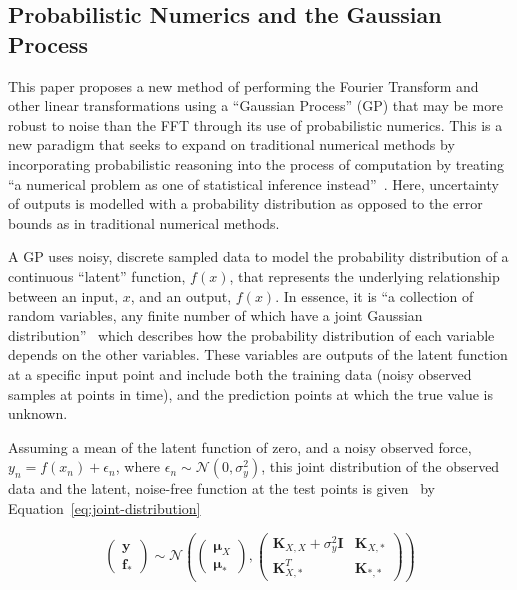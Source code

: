 \documentclass[12pt]{article}
\begin{document}
    \subsection{Probabilistic Numerics and the Gaussian Process}
    This paper proposes a new method of performing the Fourier Transform and other linear transformations using a ``Gaussian Process'' (GP) that may be more robust to noise than the FFT through its use of probabilistic numerics.
    This is a new paradigm that seeks to expand on traditional numerical methods by incorporating probabilistic reasoning into the process of computation by treating ``a numerical problem as one of statistical inference instead''~\cite{ProbabilisticNumerics2023}.
    Here, uncertainty of outputs is modelled with a probability distribution as opposed to the error bounds as in traditional numerical methods.

    A GP uses noisy, discrete sampled data to model the probability distribution of a continuous ``latent'' function, $f(x)$, that represents the underlying relationship between an input, $x$, and an output, $f(x)$.
    In essence, it is ``a collection of random variables, any finite number of which have a joint Gaussian distribution''~\cite{rasmussen2006gaussian} which describes how the probability distribution of each variable depends on the other variables.
    These variables are outputs of the latent function at a specific input point and include both the training data (noisy observed samples at points in time), and the prediction points at which the true value is unknown.

    Assuming a mean of the latent function of zero, and a noisy observed force, $y_n = f(x_n)+\epsilon_n$, where $\epsilon_n \sim \mathcal{N}(0, \sigma^2_y)$, this joint distribution of the observed data and the latent, noise-free function at the test points is given~\cite{murphy2023probabilistic} by Equation~\ref{eq:joint-distribution}

    \begin{equation}
        \begin{pmatrix}
            \mathbf{y} \\
            \mathbf{f}_*
        \end{pmatrix}
        \sim \mathcal{N} \left(
        \begin{pmatrix}
            \boldsymbol{\mu}_X \\
            \boldsymbol{\mu}_*
        \end{pmatrix},
        \begin{pmatrix}
            \mathbf{K}_{X,X} + \sigma^2_y \mathbf{I} & \mathbf{K}_{X,*} \\
            \mathbf{K}_{X,*}^T & \mathbf{K}_{*,*}
        \end{pmatrix}
        \right)\label{eq:joint-distribution}
    \end{equation}
\end{document}
